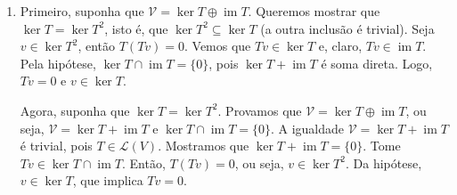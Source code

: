 \documentclass[12pt]{article}
\DeclareMathOperator{\im}{im}
\begin{document}
\begin{enumerate}
    \item[\textbf{E11}] Primeiro, suponha que \(\mathcal{V} = \ker T \oplus \im T\). Queremos mostrar que \(\ker T = \ker T^2\), isto é, que \(\ker T^2 \subseteq \ker T\) (a outra inclusão é trivial). Seja \(v \in \ker T^2\), então \(T(Tv)=0\). 
    Vemos que \(Tv \in \ker T\) e, claro, \(Tv \in \im T\). Pela hipótese, \(\ker T \cap \im T = \{0\}\), pois \(\ker T + \im T\) é soma direta. Logo, \(Tv=0\) e \(v \in \ker T\).
    
    Agora, suponha que \(\ker T=\ker T^2\). Provamos que \(\mathcal{V} = \ker T \oplus \im T\), ou seja, \(\mathcal{V} = \ker T + \im T\) e \(\ker T \cap \im T = \{0\}\). A igualdade \(\mathcal{V} = \ker T + \im T\) é trivial, pois \(T \in \mathcal{L}(V)\).
    Mostramos que \(\ker T + \im T = \{0\}\). Tome \(Tv \in \ker T \cap \im T\). Então, \(T(Tv) = 0\), ou seja, \(v \in \ker T^2\). Da hipótese, \(v \in \ker T\), que implica \(Tv = 0\).


\end{enumerate}
\end{document}
